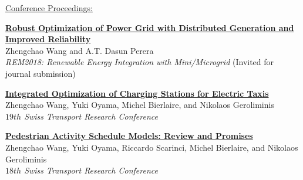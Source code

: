 \documentclass[letterpaper,11pt]{article}
\begin{document}
\underline{\sc \small Conference Proceedings:}
\begin{myitemize}
	
	\item \href{https://doi.org/10.1016/j.egypro.2018.12.069}{\bf Robust Optimization of Power Grid with Distributed Generation and Improved Reliability}\\ {Zhengchao Wang and A.T. Dasun Perera}\\ {{\it REM2018: Renewable Energy Integration with Mini/Microgrid} (Invited for journal submission)}
	\item \href{https://www.strc.ch/2019/Wang_EtAl.pdf}{\bf Integrated Optimization of Charging Stations for Electric Taxis}\\ {Zhengchao Wang, Yuki Oyama, Michel Bierlaire, and Nikolaos Geroliminis}\\ {{\it $19{th}$ Swiss Transport
Research Conference}} 
	\item \href{https://www.strc.ch/2018/Wang_EtAl.pdf}{\bf Pedestrian Activity Schedule Models: Review and Promises}\\ {Zhengchao Wang, Yuki Oyama, Riccardo Scarinci, Michel Bierlaire, and Nikolaos Geroliminis}\\ {{\it $18{th}$ Swiss Transport
Research Conference}} 
	
	\end{myitemize}
%	
\end{document}
